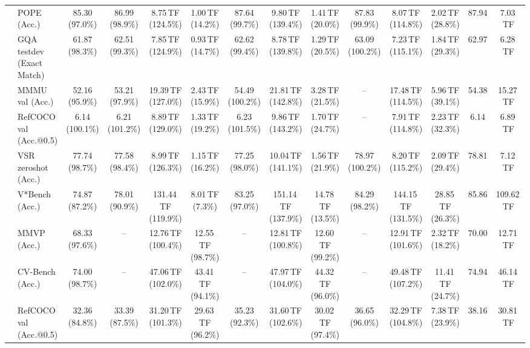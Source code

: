 \begin{table}[t]
\begin{center}
\begin{small}
\begin{sc}
{\begin{tabular}{llcccccccccccc}
& POPE (Acc.) & 85.30 (97.0\%) & 86.99 (98.9\%) & 8.75\,TF (124.5\%) & 1.00\,TF (14.2\%) & 87.64 (99.7\%) & 9.80\,TF (139.4\%) & 1.41\,TF (20.0\%) & 87.83 (99.9\%) & 8.07\,TF (114.8\%) & 2.02\,TF (28.8\%) & 87.94 & 7.03\,TF \\
& GQA testdev (Exact Match) & 61.87 (98.3\%) & 62.51 (99.3\%) & 7.85\,TF (124.9\%) & 0.93\,TF (14.7\%) & 62.62 (99.4\%) & 8.78\,TF (139.8\%) & 1.29\,TF (20.5\%) & 63.09 (100.2\%) & 7.23\,TF (115.1\%) & 1.84\,TF (29.3\%) & 62.97 & 6.28\,TF \\
& MMMU val (Acc.) & 52.16 (95.9\%) & 53.21 (97.9\%) & 19.39\,TF (127.0\%) & 2.43\,TF (15.9\%) & 54.49 (100.2\%) & 21.81\,TF (142.8\%) & 3.28\,TF (21.5\%) & -- & 17.48\,TF (114.5\%) & 5.96\,TF (39.1\%) & 54.38 & 15.27\,TF \\
& RefCOCO val (Acc.@0.5) & 6.14 (100.1\%) & 6.21 (101.2\%) & 8.89\,TF (129.0\%) & 1.33\,TF (19.2\%) & 6.23 (101.5\%) & 9.86\,TF (143.2\%) & 1.70\,TF (24.7\%) & -- & 7.91\,TF (114.8\%) & 2.23\,TF (32.3\%) & 6.14 & 6.89\,TF \\
& VSR zeroshot (Acc.) & 77.74 (98.7\%) & 77.58 (98.4\%) & 8.99\,TF (126.3\%) & 1.15\,TF (16.2\%) & 77.25 (98.0\%) & 10.04\,TF (141.1\%) & 1.56\,TF (21.9\%) & 78.97 (100.2\%) & 8.20\,TF (115.2\%) & 2.09\,TF (29.4\%) & 78.81 & 7.12\,TF \\
& V*Bench (Acc.) & 74.87 (87.2\%) & 78.01 (90.9\%) & 131.44\,TF (119.9\%) & 8.01\,TF (7.3\%) & 83.25 (97.0\%) & 151.14\,TF (137.9\%) & 14.78\,TF (13.5\%) & 84.29 (98.2\%) & 144.15\,TF (131.5\%) & 28.85\,TF (26.3\%) & 85.86 & 109.62\,TF \\
\midrule
{}
& MMVP (Acc.) & 68.33 (97.6\%) & -- & 12.76\,TF (100.4\%) & 12.55\,TF (98.7\%) & -- & 12.81\,TF (100.8\%) & 12.60\,TF (99.2\%) & -- & 12.91\,TF (101.6\%) & 2.32\,TF (18.2\%) & 70.00 & 12.71\,TF \\
& CV-Bench (Acc.) & 74.00 (98.7\%) & -- & 47.06\,TF (102.0\%) & 43.41\,TF (94.1\%) & -- & 47.97\,TF (104.0\%) & 44.32\,TF (96.0\%) & -- & 49.48\,TF (107.2\%) & 11.41\,TF (24.7\%) & 74.94 & 46.14\,TF \\
& RefCOCO val (Acc.@0.5) & 32.36 (84.8\%) & 33.39 (87.5\%) & 31.20\,TF (101.3\%) & 29.63\,TF (96.2\%) & 35.23 (92.3\%) & 31.60\,TF (102.6\%) & 30.02\,TF (97.4\%) & 36.65 (96.0\%) & 32.29\,TF (104.8\%) & 7.38\,TF (23.9\%) & 38.16 & 30.81\,TF \\

\end{tabular}}
\end{sc}
\end{small}
\end{center}
\end{table}

